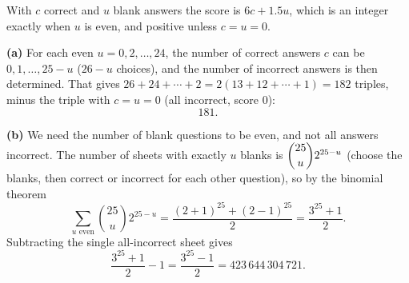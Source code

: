 With $c$ correct and $u$ blank answers the score is $6c+1.5u$, which is an integer exactly when $u$ is even, and positive unless $c=u=0$.

\textbf{(a)} For each even $u=0,2,\ldots,24$, the number of correct answers $c$ can be $0,1,\ldots,25-u$ ($26-u$ choices), and the number of incorrect answers is then determined. That gives $26+24+\cdots+2=2(13+12+\cdots+1)=182$ triples, minus the triple with $c=u=0$ (all incorrect, score $0$):
\[\boxed{181}.\]

\textbf{(b)} We need the number of blank questions to be even, and not all answers incorrect. The number of sheets with exactly $u$ blanks is $\dbinom{25}{u}2^{25-u}$ (choose the blanks, then correct or incorrect for each other question), so by the binomial theorem
\[\sum_{u\text{ even}}\binom{25}{u}2^{25-u}=\dfrac{(2+1)^{25}+(2-1)^{25}}{2}=\dfrac{3^{25}+1}{2}.\]
Subtracting the single all-incorrect sheet gives
\[\dfrac{3^{25}+1}{2}-1=\boxed{\dfrac{3^{25}-1}{2}=423\,644\,304\,721}.\]
